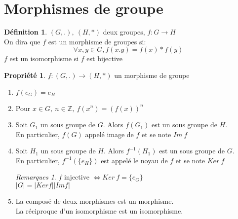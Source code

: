 \documentclass[fleqn]{article}
\theoremstyle{definition} \newtheorem*{defi}{D\'efinition}
\theoremstyle{definition} \newtheorem*{theo}{Th\'eor\`eme}
\theoremstyle{definition} \newtheorem*{coro}{Corollaire}
\theoremstyle{remark} \newtheorem*{rqs}{Remarques}
\theoremstyle{definition} \newtheorem*{prop}{Propri\'et\'e}
\begin{document}
\section{Morphismes de groupe}
\begin{defi}
$(G,.),\ (H, *)$ deux groupes, $f: G \rightarrow H$ \\
On dira que $f$ est un morphisme de groupes si:
\[\forall x,y \in G, f(x.y) = f(x) * f(y)\]
$f$ est un isomorphisme si $f$ est bijective
\end{defi}

\begin{prop} $f: (G,.) \rightarrow (H,*)$ un morphisme de groupe
	\begin{enumerate}
		\item $f(e_G) = e_H$
		\item Pour $x \in G,\ n \in \mathbb{Z},\ f(x^n) = (f(x))^n$
		\item Soit $G_1$ un sous groupe de $G$. Alors $f(G_1)$ est un sous groupe de $H$.\\ En particulier, $f(G)$ appel\'e image de $f$
			et se note $Im\ f$
		\item Soit $H_1$ un sous groupe de $H$. Alors $f^{-1}(H_1)$ est un sous groupe de $G$. \\ En particulier, $f^{-1}(\{e_H\})$ est
			appel\'e le noyau de $f$ et se note $Ker\ f$
		\begin{rqs} $f$ injective $\Leftrightarrow Ker\ f = \{e_G\}$ \\ $|G| = |Ker f| |Im f|$ \end{rqs}
		\item La compos\'e de deux morphismes est un morphisme.\\
			La r\'eciproque d'un isomorphisme est un isomorphisme.
	\end{enumerate}
\end{prop}
\end{document}

